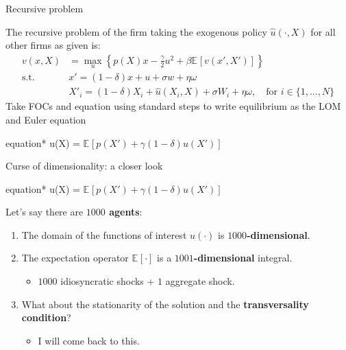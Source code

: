 \documentclass[aspectratio=169,10pt]{beamer}
\newcommand{\emphcolor}[1]{\textbf{\textcolor{emphcolorval}{#1}}}
\newcommand{\expec}[2][]{\ensuremath{\mathbb{E}_{{#1}}\left[ {#2} \right]}}
\begin{document}
	\begin{frame}{Recursive problem}
	
	
	The recursive problem of the firm taking the exogenous policy $\hat{u}(\cdot, X)$ for all other firms as given is:
	\begin{align*}
		v(x,X)       & =\max_{u}\left\{p(X)x -  \frac{\gamma}{2} u^2 + \beta \expec{v(x',X')}\right\}                      \\
		\text{s.t. } & x' = (1-\delta)x + u + \sigma w + \eta \omega                                                       \\
		& X'_i = (1-\delta)X_i + \hat{u}(X_i,X) + \sigma W_i + \eta \omega,\quad\text{for } i \in \{1,...,N\}\end{align*}
	Take FOCs and equation using standard steps to write equilibrium as the LOM and Euler equation
	\begin{empheq}[box=\tcbhighmath]{equation*}
		\gamma u(X) = \beta \expec{p(X')+\gamma (1-\delta) u(X') }
	\end{empheq}
	

\end{frame}


\begin{frame}{Curse of dimensionality: a closer look }
	\begin{empheq}[box=\tcbhighmath]{equation*}
		\gamma u(X) = \beta \expec{p(X')+\gamma (1-\delta) u(X') }
	\end{empheq}
Let's say there are \emphcolor{$1000$ agents}:
\begin{enumerate}
	\item The domain of the functions of interest $u(\cdot)$ is \emphcolor{$1000$-dimensional}.\vspace{0.1in}
	\item The expectation operator $\expec{\cdot}$  is a \emphcolor{$1001$-dimensional} integral.\vspace{0.1in}
	\begin{itemize}
		\item $1000$ idiosyncratic shocks + $1$ aggregate shock.\vspace{0.1in}
	\end{itemize}
	\item What about the stationarity of the solution and the \emphcolor{transversality condition}?\vspace{0.1in}
	\begin{itemize}
		\item I will come back to this.
	\end{itemize}
\end{enumerate}
	
\end{frame}
\end{document}
